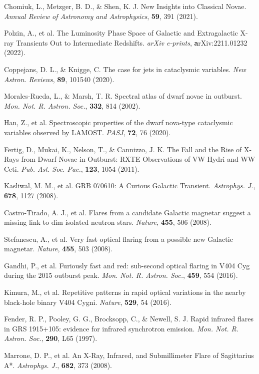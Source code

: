\documentclass{nature_plusfigure}
\newcommand{\mn}{{Mon. Not. R. Astron. Soc.}}
\newcommand{\nar}{{New Astron. Reviews}}
\newcommand{\mnras}{\mn}
\newcommand{\apj}{{Astrophys. J.}}
\newcommand{\nat}{{Nature}}
\newcommand{\pasj}{{PASJ}}
\newcommand{\pasp}{{Pub. Ast. Soc. Pac.}}
\newcommand{\araa}{Annual Review of Astronomy and Astrophysics}
\begin{document}
\begin{methods}
\begin{thebibliography}{10}
 Chomiuk, L., Metzger, B. D., \& Shen, K. J. New Insights into Classical Novae. \emph{\araa}, \textbf{59}, 391 (2021). 

 Polzin, A., et al. The Luminosity Phase Space of Galactic and Extragalactic X-ray Transients Out to Intermediate Redshifts. \emph{arXiv e-prints}, \textbf arXiv:2211.01232 (2022). 

 Coppejans, D. L., \& Knigge, C. The case for jets in cataclysmic variables. \emph{\nar}, \textbf{89}, 101540 (2020). 

 Morales-Rueda, L., \& Marsh, T. R. Spectral atlas of dwarf novae in outburst. \emph{\mnras}, \textbf{332}, 814 (2002). 

 Han, Z., et al. Spectroscopic properties of the dwarf nova-type cataclysmic variables observed by LAMOST. \emph{\pasj}, \textbf{72}, 76 (2020). 

 Fertig, D., Mukai, K., Nelson, T., \& Cannizzo, J. K. The Fall and the Rise of X-Rays from Dwarf Novae in Outburst: RXTE Observations of VW Hydri and WW Ceti. \emph{\pasp}, \textbf{123}, 1054 (2011). 

 Kasliwal, M. M., et al. GRB 070610: A Curious Galactic Transient. \emph{\apj}, \textbf{678}, 1127 (2008). 

 Castro-Tirado, A. J., et al. Flares from a candidate Galactic magnetar suggest a missing link to dim isolated neutron stars. \emph{\nat}, \textbf{455}, 506 (2008). 

 Stefanescu, A., et al. Very fast optical flaring from a possible new Galactic magnetar. \emph{\nat}, \textbf{455}, 503 (2008). 

 Gandhi, P., et al. Furiously fast and red: sub-second optical flaring in V404 Cyg during the 2015 outburst peak. \emph{\mnras}, \textbf{459}, 554 (2016). 

 Kimura, M., et al. Repetitive patterns in rapid optical variations in the nearby black-hole binary V404 Cygni. \emph{\nat}, \textbf{529}, 54 (2016). 

 Fender, R. P., Pooley, G. G., Brocksopp, C., \& Newell, S. J. Rapid infrared flares in GRS 1915+105: evidence for infrared synchrotron emission. \emph{\mnras}, \textbf{290}, L65 (1997). 

 Marrone, D. P., et al. An X-Ray, Infrared, and Submillimeter Flare of Sagittarius A*. \emph{\apj}, \textbf{682}, 373 (2008). 


\end{thebibliography}
\end{methods}
\end{document}
